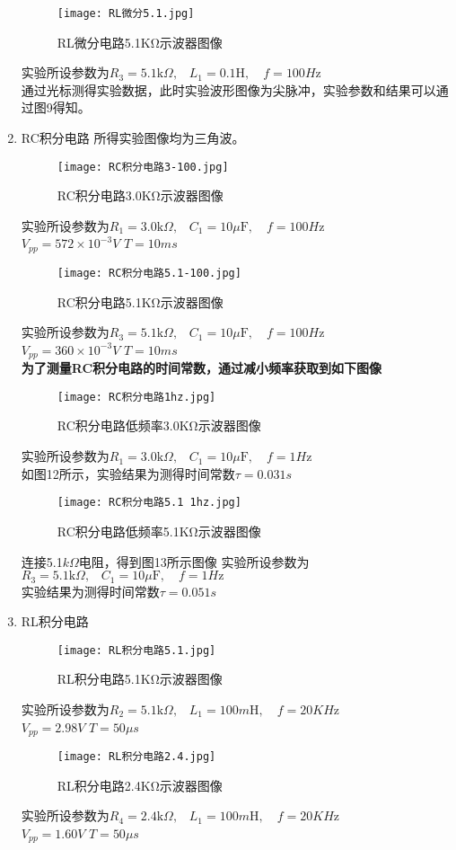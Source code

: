 \documentclass[dvipsnames, svgnames,a4paper,11pt]{article}
\begin{document}
\begin{enumerate}
\begin{figure}[{H}]
	\centering
	\texttt{[image: RL微分5.1.jpg]}
	\caption{RL微分电路5.1KΩ示波器图像}
	\label{}
\end{figure}
实验所设参数为$R_3=5.1\text{k}\Omega\text{,}\quad L_1=0.1\text{H},\quad f=100H\text{z}$\\
\indent 通过光标测得实验数据，此时实验波形图像为尖脉冲，实验参数和结果可以通过图9得知。
\item RC积分电路
 所得实验图像均为三角波。
\begin{figure}[{H}]
	\centering
	\texttt{[image: RC积分电路3-100.jpg]}
	\caption{RC积分电路3.0KΩ示波器图像}
	\label{}
\end{figure}
实验所设参数为$R_1=3.0\text{k}\Omega\text{,}\quad C_1=10\mu\text{F},\quad f=100H\text{z}$\\
$V_{pp}=572 \times 10^{-3}V$ \quad $T=10ms$
\begin{figure}[{H}]
	\centering
	\texttt{[image: RC积分电路5.1-100.jpg]}
	\caption{RC积分电路5.1KΩ示波器图像}
	\label{}
\end{figure}
实验所设参数为$R_3=5.1\text{k}\Omega\text{,}\quad C_1=10\mu\text{F},\quad f=100H\text{z}$\\
$V_{pp}=360 \times 10^{-3}V$ \quad $T=10ms$\\
\textbf{为了测量RC积分电路的时间常数，通过减小频率获取到如下图像}
\begin{figure}[{H}]
	\centering
	\texttt{[image: RC积分电路1hz.jpg]}
	\caption{RC积分电路低频率3.0KΩ示波器图像}
	\label{}
\end{figure}
实验所设参数为$R_1=3.0\text{k}\Omega\text{,}\quad C_1=10\mu\text{F},\quad f=1H\text{z}$\\
如图12所示，实验结果为测得时间常数$\tau=0.031s$\\
\begin{figure}[{H}]
	\centering
	\texttt{[image: RC积分电路5.1 1hz.jpg]}
	\caption{RC积分电路低频率5.1KΩ示波器图像}
	\label{}
\end{figure}
连接5.1$k\Omega$电阻，得到图13所示图像
实验所设参数为$R_3=5.1\text{k}\Omega\text{,}\quad C_1=10\mu\text{F},\quad f=1H\text{z}$\\
实验结果为测得时间常数$\tau=0.051s$\\
\item RL积分电路 
 \begin{figure}[{H}]
	\centering
	\texttt{[image: RL积分电路5.1.jpg]}
	\caption{RL积分电路5.1KΩ示波器图像}
	\label{}
 \end{figure}
 实验所设参数为$R_2=5.1\text{k}\Omega\text{,}\quad L_1=100m\text{H},\quad f=20KH\text{z}$\\
$V_{pp}=2.98 V$ \quad $T=50\mu s$
\begin{figure}[{H}]
	\centering
	\texttt{[image: RL积分电路2.4.jpg]}
	\caption{RL积分电路2.4KΩ示波器图像}
	\label{}
\end{figure}
实验所设参数为$R_4=2.4\text{k}\Omega\text{,}\quad L_1=100m\text{H},\quad f=20KH\text{z}$\\
$V_{pp}=1.60 V$ \quad $T=50\mu s$\\


\end{enumerate}
\end{document}

